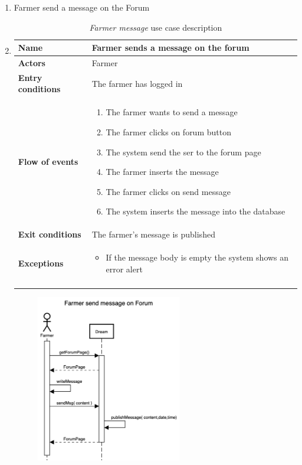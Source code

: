 \begin{enumerate}
        \item Farmer send a message on the Forum
        \item \begin{longtable}{p{0.26\linewidth}p{0.75\linewidth}}
            \toprule
            \textbf{Name} & \textbf{Farmer sends a message on the forum} \\
            \midrule
            \textbf{Actors} & Farmer \\
            \midrule
            \textbf{Entry conditions} & The farmer has logged in\\
            \midrule
            \textbf{Flow of events} & 
            \begin{enumerate}
                \item The farmer wants to send a message
                \item The farmer clicks on forum button
                \item The system send the ser to the forum page
                \item The farmer inserts the message 
                \item The farmer clicks on send message
                \item The system inserts the message into the database 
            \end{enumerate} \\
            \midrule
            \textbf{Exit conditions} & The farmer's message is published\\
            \midrule
            \textbf{Exceptions} & 
            \begin{itemize}
                \item If the message body is empty the system shows an error alert
            \end{itemize} \\
            \bottomrule
            \caption{\emph{Farmer message} use case description}
        \end{longtable}
        \begin{figure}[H]
            \begin{center}
            \includegraphics[width=0.6\textwidth]{sequence/messageOnForum.png}

\end{center}
\end{figure}
\end{enumerate}
